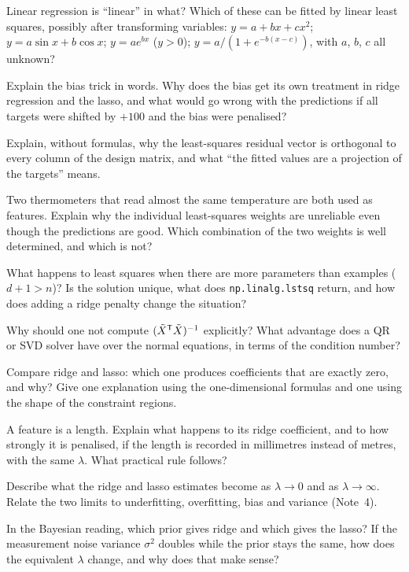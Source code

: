 \documentclass[11pt]{article}
\newcommand{\Xt}{\tilde X}
\begin{document}
\begin{questions}
\begin{conceptual}
\item Linear regression is ``linear'' in what? Which of these can be fitted by linear least squares, possibly after
transforming variables: $y = a + bx + cx^2$; $y = a\sin x + b\cos x$; $y = a e^{bx}$ ($y > 0$); $y = a/(1 + e^{-b(x-c)})$,
with $a$, $b$, $c$ all unknown?
\item Explain the bias trick in words. Why does the bias get its own treatment in ridge regression and the lasso, and
what would go wrong with the predictions if all targets were shifted by $+100$ and the bias were penalised?
\item Explain, without formulas, why the least-squares residual vector is orthogonal to every column of the design
matrix, and what ``the fitted values are a projection of the targets'' means.
\item Two thermometers that read almost the same temperature are both used as features. Explain why the individual
least-squares weights are unreliable even though the predictions are good. Which combination of the two weights is well
determined, and which is not?
\item What happens to least squares when there are more parameters than examples ($d + 1 > n$)? Is the solution unique,
what does \texttt{np.linalg.lstsq} return, and how does adding a ridge penalty change the situation?
\item Why should one not compute $(\Xt\T\Xt)^{-1}$ explicitly? What advantage does a QR or SVD solver have over the
normal equations, in terms of the condition number?
\item Compare ridge and lasso: which one produces coefficients that are exactly zero, and why? Give one explanation using
the one-dimensional formulas and one using the shape of the constraint regions.
\item A feature is a length. Explain what happens to its ridge coefficient, and to how strongly it is penalised, if the
length is recorded in millimetres instead of metres, with the same $\lambda$. What practical rule follows?
\item Describe what the ridge and lasso estimates become as $\lambda \to 0$ and as $\lambda \to \infty$. Relate the two
limits to underfitting, overfitting, bias and variance (Note~4).
\item In the Bayesian reading, which prior gives ridge and which gives the lasso? If the measurement noise variance
$\sigma^2$ doubles while the prior stays the same, how does the equivalent $\lambda$ change, and why does that make sense?

\end{conceptual}
\end{questions}
\end{document}

